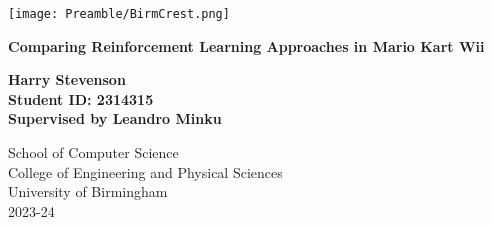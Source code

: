 
\thispagestyle{empty}

\begin{spacing}{2}
	\begin{center}
		\texttt{[image: Preamble/BirmCrest.png]}
	\end{center}
	\vspace{10mm}
	\begin{center}
		\textbf{\Large Comparing Reinforcement Learning Approaches in Mario Kart Wii}
		\vspace{10mm}
	\end{center}
	\begin{center}
		\vspace{20mm}
		\textbf{\Large Harry Stevenson}
            \\\textbf{\large Student ID: 2314315}
            \\\textbf{\large Supervised by Leandro Minku}
		\vspace{30mm}
	\end{center}
	\begin{center}
		{\large School of Computer Science}
		\\ {\large College of Engineering and Physical Sciences}
		\\ {\large University of Birmingham}
		\\ {\large 2023-24}
	\end{center}
\end{spacing}



